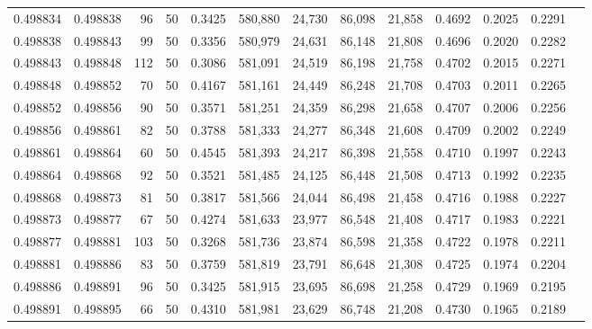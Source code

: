 \begin{tabular}{rrrrrrrrrrrrr}
0.498834 & 0.498838 &    96 &  50 &                                     0.3425 & 580,880 &  24,730 &  86,098 &  21,858 & 0.4692 & 0.2025 & 0.2291 \\
0.498838 & 0.498843 &    99 &  50 &                                     0.3356 & 580,979 &  24,631 &  86,148 &  21,808 & 0.4696 & 0.2020 & 0.2282 \\
0.498843 & 0.498848 &   112 &  50 &                                     0.3086 & 581,091 &  24,519 &  86,198 &  21,758 & 0.4702 & 0.2015 & 0.2271 \\
0.498848 & 0.498852 &    70 &  50 &                                     0.4167 & 581,161 &  24,449 &  86,248 &  21,708 & 0.4703 & 0.2011 & 0.2265 \\
0.498852 & 0.498856 &    90 &  50 &                                     0.3571 & 581,251 &  24,359 &  86,298 &  21,658 & 0.4707 & 0.2006 & 0.2256 \\
0.498856 & 0.498861 &    82 &  50 &                                     0.3788 & 581,333 &  24,277 &  86,348 &  21,608 & 0.4709 & 0.2002 & 0.2249 \\
0.498861 & 0.498864 &    60 &  50 &                                     0.4545 & 581,393 &  24,217 &  86,398 &  21,558 & 0.4710 & 0.1997 & 0.2243 \\
0.498864 & 0.498868 &    92 &  50 &                                     0.3521 & 581,485 &  24,125 &  86,448 &  21,508 & 0.4713 & 0.1992 & 0.2235 \\
0.498868 & 0.498873 &    81 &  50 &                                     0.3817 & 581,566 &  24,044 &  86,498 &  21,458 & 0.4716 & 0.1988 & 0.2227 \\
0.498873 & 0.498877 &    67 &  50 &                                     0.4274 & 581,633 &  23,977 &  86,548 &  21,408 & 0.4717 & 0.1983 & 0.2221 \\
0.498877 & 0.498881 &   103 &  50 &                                     0.3268 & 581,736 &  23,874 &  86,598 &  21,358 & 0.4722 & 0.1978 & 0.2211 \\
0.498881 & 0.498886 &    83 &  50 &                                     0.3759 & 581,819 &  23,791 &  86,648 &  21,308 & 0.4725 & 0.1974 & 0.2204 \\
0.498886 & 0.498891 &    96 &  50 &                                     0.3425 & 581,915 &  23,695 &  86,698 &  21,258 & 0.4729 & 0.1969 & 0.2195 \\
0.498891 & 0.498895 &    66 &  50 &                                     0.4310 & 581,981 &  23,629 &  86,748 &  21,208 & 0.4730 & 0.1965 & 0.2189 \\

\end{tabular}
